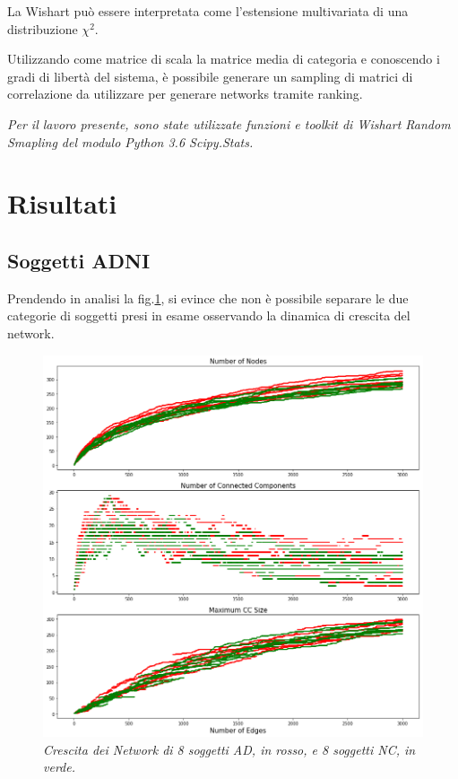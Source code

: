\documentclass[12pt,openright,a4paper]{article}
\begin{document}
La Wishart può essere interpretata come l'estensione multivariata di una distribuzione $\chi^2$.

Utilizzando come matrice di scala la matrice media di categoria e conoscendo i gradi di libertà del sistema, è possibile generare un sampling di matrici di correlazione da utilizzare per generare networks tramite ranking.

\textit{Per il lavoro presente, sono state utilizzate funzioni e toolkit di Wishart Random Smapling del modulo Python 3.6 Scipy.Stats.}

\section{Risultati}

\subsection{Soggetti ADNI}

Prendendo in analisi la fig.\ref{ADNI-ADNC}, si evince che non è possibile separare le due categorie di soggetti presi in esame osservando la dinamica di crescita del network.

\begin{figure}[!h]
\centering
\includegraphics[scale=0.4]{Network-growth}
\caption{\textit{Crescita dei Network di 8 soggetti AD, in rosso, e 8 soggetti NC, in verde.}}
\label{ADNI-ADNC}
\end{figure}
\end{document}

